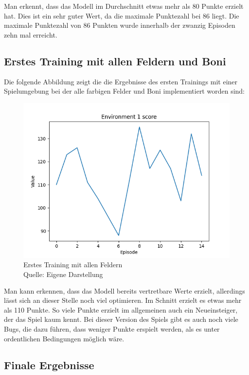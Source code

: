Man erkennt, dass das Modell im Durchschnitt etwas mehr als 80 Punkte erzielt hat. Dies ist ein sehr guter Wert, da die maximale Punktezahl bei 86 liegt. Die maximale Punktezahl von 86 Punkten wurde innerhalb der zwanzig Episoden zehn mal erreicht.
\subsection{Erstes Training mit allen Feldern und Boni}
Die folgende Abbildung zeigt die die Ergebnisse des ersten Trainings mit einer Spielumgebung bei der alle farbigen Felder und Boni implementiert worden sind:
\nopagebreak
\begin{figure}[H]
	\includegraphics[width=1\textwidth]{Bilder/firsttrainingwithallfields} 
	\caption[Erstes Training mit allen Feldern]{Erstes Training mit allen Feldern\\ Quelle: Eigene Darstellung}
\end{figure}

Man kann erkennen, dass das Modell bereits vertretbare Werte erzielt, allerdings lässt sich an dieser Stelle noch viel optimieren. Im Schnitt erzielt es etwas mehr als 110 Punkte. So viele Punkte erzielt im allgemeinen auch ein Neueinsteiger, der das Spiel kaum kennt. Bei dieser Version des Spiels gibt es auch noch viele Bugs, die dazu führen, dass weniger Punkte erspielt werden, als es unter ordentlichen Bedingungen möglich wäre.
\subsection{Finale Ergebnisse}

